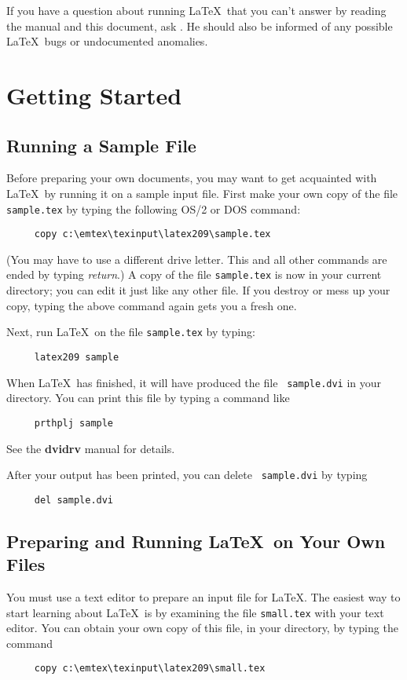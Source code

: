 If you have a question about running \LaTeX\
that you can't answer by reading the manual and
this document, ask \contact.  He should also be informed of any
possible \LaTeX\ bugs or undocumented anomalies.
 
 
\section{Getting Started}
 
\subsection{Running a Sample File} \label{sec:sample}
 
Before preparing your own documents, you may want to get acquainted
with \LaTeX\ by running it on a sample input file.  First make your own
copy of the file \mbox{\tt sample.tex} by typing the following
OS/2 or DOS command:
\begin{verbatim}
     copy c:\emtex\texinput\latex209\sample.tex
\end{verbatim}
(You may have to use a different drive letter. This and all other
commands are ended by typing {\em return}.)
A copy of the file \mbox{\tt sample.tex} is now in your current
directory; you can edit it just like any other file.  If you destroy or
mess up your copy, typing the above command again gets you a fresh
one.
 
Next, run \LaTeX\ on the file \mbox{\tt sample.tex} by typing:
\begin{verbatim}
     latex209 sample
\end{verbatim}
When \LaTeX\ has finished, it will have produced the file \mbox{\tt
sample.dvi} in your directory.  You can print this file by typing a
command like
\begin{verbatim}
     prthplj sample
\end{verbatim}
See the {\bf dvidrv} manual for details.
 
After your output has been printed, you can delete \mbox{\tt
sample.dvi} by typing
\begin{verbatim}
     del sample.dvi
\end{verbatim}
 
\subsection{Preparing and Running \LaTeX\ on Your Own Files}
 
You must use a text editor to prepare an input file for \LaTeX. The
easiest way to start learning about \LaTeX\ is by 
examining the file \mbox{\tt small.tex} with your text editor.
You can obtain your own copy of this file, in your directory,
by typing the command
\begin{verbatim}
     copy c:\emtex\texinput\latex209\small.tex
\end{verbatim}
 

